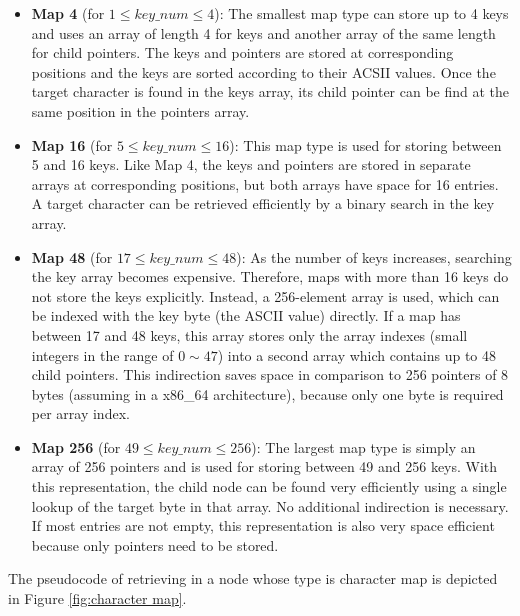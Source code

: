 \documentclass[legalpaper]{article}
\begin{document}
\begin{itemize}
\item \textbf{Map 4} (for $1 \le key\_num \le 4$): The smallest map
type can store up to 4 keys and uses an array of length 4 for keys and
another array of the same length for child pointers. The keys and
pointers are stored at corresponding positions and the keys are sorted
according to their ACSII values. Once the target character is found in
the keys array, its child pointer can be find at the same position in
the pointers array.

\item \textbf{Map 16} (for $5 \le key\_num \le 16$): This map type is
used for storing between 5 and 16 keys. Like Map 4, the keys and
pointers are stored in separate arrays at corresponding positions, but
both arrays have space for 16 entries. A target character can be
retrieved efficiently by a binary search in the key array.

\item \textbf{Map 48} (for $17 \le key\_num \le 48$): As the number of
keys increases, searching the key array becomes expensive. Therefore,
maps with more than 16 keys do not store the keys explicitly. Instead,
a 256-element array is used, which can be indexed with the key byte
(the ASCII value) directly. If a map has between 17 and 48 keys, this
array stores only the \textsf{array indexes} (small integers in the
range of $0 \sim 47$) into a second array which contains up to 48
child pointers. This indirection saves space in comparison to 256
pointers of 8 bytes (assuming in a x86\_64 architecture), because only
one byte is required per array index.

\item \textbf{Map 256} (for $49 \le key\_num \le 256$): The largest
map type is simply an array of 256 pointers and is used for storing
between 49 and 256 keys.  With this representation, the child node can
be found very efficiently using a single lookup of the target byte in
that array.  No additional indirection is necessary. If most entries
are not empty, this representation is also very space efficient
because only pointers need to be stored.

\end{itemize}

The pseudocode of retrieving in a node whose type is character map is
depicted in Figure \ref{fig:character map}.
\end{document}
